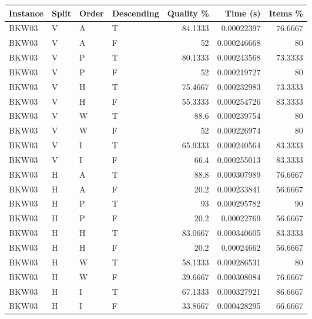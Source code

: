 \begin{tabular}{llllrrr}
    \hline
    Instance & Split & Order & Descending & Quality \% & Time (s)    & Items \% \\
    \hline
    BKW03    & V     & A     & T          & 84.1333    & 0.00022397  & 76.6667  \\
    BKW03    & V     & A     & F          & 52         & 0.000246668 & 80       \\
    BKW03    & V     & P     & T          & 80.1333    & 0.000243568 & 73.3333  \\
    BKW03    & V     & P     & F          & 52         & 0.000219727 & 80       \\
    BKW03    & V     & H     & T          & 75.4667    & 0.000232983 & 73.3333  \\
    BKW03    & V     & H     & F          & 55.3333    & 0.000254726 & 83.3333  \\
    BKW03    & V     & W     & T          & 88.6       & 0.000239754 & 80       \\
    BKW03    & V     & W     & F          & 52         & 0.000226974 & 80       \\
    BKW03    & V     & I     & T          & 65.9333    & 0.000240564 & 83.3333  \\
    BKW03    & V     & I     & F          & 66.4       & 0.000255013 & 83.3333  \\
    BKW03    & H     & A     & T          & 88.8       & 0.000307989 & 76.6667  \\
    BKW03    & H     & A     & F          & 20.2       & 0.000233841 & 56.6667  \\
    BKW03    & H     & P     & T          & 93         & 0.000295782 & 90       \\
    BKW03    & H     & P     & F          & 20.2       & 0.00022769  & 56.6667  \\
    BKW03    & H     & H     & T          & 83.0667    & 0.000340605 & 83.3333  \\
    BKW03    & H     & H     & F          & 20.2       & 0.00024662  & 56.6667  \\
    BKW03    & H     & W     & T          & 58.1333    & 0.000286531 & 80       \\
    BKW03    & H     & W     & F          & 39.6667    & 0.000308084 & 76.6667  \\
    BKW03    & H     & I     & T          & 67.1333    & 0.000327921 & 86.6667  \\
    BKW03    & H     & I     & F          & 33.8667    & 0.000428295 & 66.6667  \\

\end{tabular}
